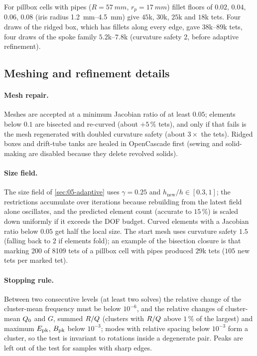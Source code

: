 For pillbox cells with pipes ($R=\SI{57}{mm}$, $r_p=\SI{17}{mm}$) fillet floors of $0.02$, $0.04$, $0.06$, $0.08$ (iris radius \SI{1.2}{mm}--\SI{4.5}{mm}) give $45$k, $30$k, $25$k and $18$k tets.
Four draws of the ridged box, which has fillets along every edge, gave $38$k--$89$k tets, four draws of the spoke family $5.2$k--$7.8$k (curvature safety 2, before adaptive refinement).

\subsection{Meshing and refinement details}\label{sec:A05-mesh}

\paragraph{Mesh repair.}
Meshes are accepted at a minimum Jacobian ratio of at least $0.05$; elements below $0.1$ are bisected and re-curved (about $+5\,\%$ tets), and only if that fails is the mesh regenerated with doubled curvature safety (about $3\times$ the tets).
Ridged boxes and drift-tube tanks are healed in OpenCascade first (sewing and solid-making are disabled because they delete revolved solids).
\paragraph{Size field.}
The size field of \cref{sec:05-adaptive} uses $\gamma=0.25$ and $h_{\mathrm{new}}/h\in[0.3,1]$; the restrictions accumulate over iterations because rebuilding from the latest field alone oscillates, and the predicted element count (accurate to $15\,\%$) is scaled down uniformly if it exceeds the DOF budget.
Curved elements with a Jacobian ratio below $0.05$ get half the local size.
The start mesh uses curvature safety $1.5$ (falling back to $2$ if elements fold); an example of the bisection closure is that marking 200 of 8109 tets of a pillbox cell with pipes produced $29$k tets ($105$ new tets per marked tet).
\paragraph{Stopping rule.}
Between two consecutive levels (at least two solves) the relative change of the cluster-mean frequency must be below $10^{-6}$, and the relative changes of cluster-mean $\Qz$ and $G$, summed $R/Q$ (clusters with $R/Q$ above $1\,\%$ of the largest) and maximum $\Epk$, $\Bpk$ below $10^{-3}$; modes with relative spacing below $10^{-3}$ form a cluster, so the test is invariant to rotations inside a degenerate pair.
Peaks are left out of the test for samples with sharp edges.

